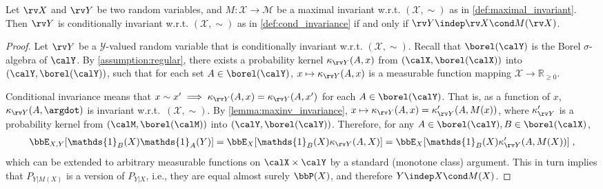 \documentclass[final]{article}
\begin{document}
\begin{lemma}\label{lemma:desintegration}
Let $\rv X$ and $\rv Y$ be two random variables, and $M: \mathcal{X} \to \mathcal{M}$ be a maximal invariant w.r.t. $(\mathcal{X}, \sim)$ as in \cref{def:maximal_invariant}.
Then $\rv Y$ is conditionally invariant w.r.t. $(\mathcal{X}, \sim)$ as in \cref{def:cond_invariance} if and only if $\rv Y \indep \rv X \cond M(\rv X)$.
\end{lemma}
\begin{proof}
Let $\rv Y$ be a $\mathcal{Y}$-valued random variable that is conditionally invariant w.r.t. $(\mathcal{X}, \sim)$. Recall that $\borel(\calY)$ is the Borel $\sigma$-algebra of $\calY$. 
By \cref{assumption:regular}, there exists a probability kernel $\kappa_{\rv Y}(A,x)$ from $(\calX,\borel(\calX))$ into $(\calY,\borel(\calY))$, such that for each set  $A \in \borel(\calY)$, $x \mapsto \kappa_{\rv Y}(A,x)$ is a measurable function mapping $\mathcal{X} \to \mathbb{R}_{\geq 0}$.

Conditional invariance means that $x \sim x' \implies \kappa_{\rv Y}(A,x) = \kappa_{\rv Y}(A,x')$ for each $A\in\borel(\calY)$. 
That is, as a function of $x$, $\kappa_{\rv Y}(A,\argdot)$ is invariant w.r.t.\ $(\mathcal{X}, \sim)$. 
By \cref{lemma:maxinv_invariance}, $x \mapsto \kappa_{\rv Y}(A,x) = \kappa_{\rv Y}'(A,M(x))$, where $\kappa_{\rv Y}'$ is a probability kernel from $(\calM, \borel(\calM))$ into $(\calY, \borel(\calY))$. Therefore, for any $A \in \borel(\calY), B \in \borel(\calX)$,
\begin{align*}
	\bbE_{X,Y}[\mathds{1}_B(X) \mathds{1}_A(Y)] = \bbE_X[\mathds{1}_B(X) \kappa_{\rv Y}(A,X)] = \bbE_X[\mathds{1}_B(X) \kappa_{\rv Y}'(A,M(X))] \;,
\end{align*}
which can be extended to arbitrary measurable functions on $\calX \times \calY$ by a standard (monotone class) argument. This in turn implies that $P_{Y|M(X)}$ is a version of $P_{Y|X}$, i.e., they are equal almost surely $\bbP(X)$, and therefore $Y \indep X \cond M(X)$.
\end{proof}
\end{document}

